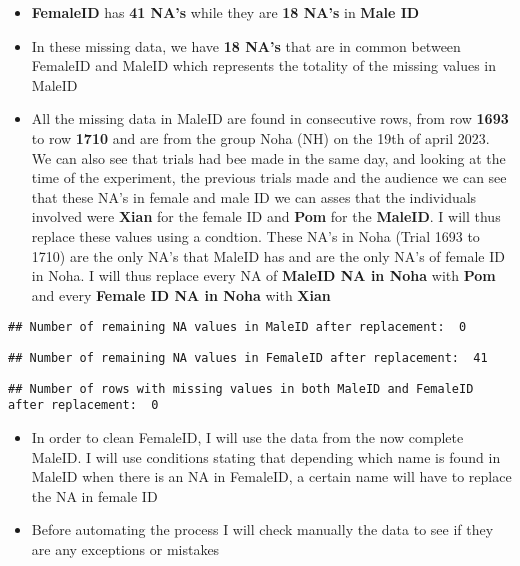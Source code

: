 \documentclass[
]{article}
\begin{document}
\begin{itemize}
\item
  \textbf{FemaleID} has \textbf{41 NA's} while they are \textbf{18 NA's}
  in \textbf{Male ID}
\item
  In these missing data, we have \textbf{18 NA's} that are in common
  between FemaleID and MaleID which represents the totality of the
  missing values in MaleID
\item
  All the missing data in MaleID are found in consecutive rows, from row
  \textbf{1693} to row \textbf{1710} and are from the group Noha (NH) on
  the 19th of april 2023. We can also see that trials had bee made in
  the same day, and looking at the time of the experiment, the previous
  trials made and the audience we can see that these NA's in female and
  male ID we can asses that the individuals involved were \textbf{Xian}
  for the female ID and \textbf{Pom} for the \textbf{MaleID}. I will
  thus replace these values using a condtion. These NA's in Noha (Trial
  1693 to 1710) are the only NA's that MaleID has and are the only NA's
  of female ID in Noha. I will thus replace every NA of \textbf{MaleID
  NA in Noha} with \textbf{Pom} and every \textbf{Female ID NA in Noha}
  with \textbf{Xian}
\end{itemize}

\begin{verbatim}
## Number of remaining NA values in MaleID after replacement:  0
\end{verbatim}

\begin{verbatim}
## Number of remaining NA values in FemaleID after replacement:  41
\end{verbatim}

\begin{verbatim}
## Number of rows with missing values in both MaleID and FemaleID after replacement:  0
\end{verbatim}

\begin{itemize}
\item
  In order to clean FemaleID, I will use the data from the now complete
  MaleID. I will use conditions stating that depending which name is
  found in MaleID when there is an NA in FemaleID, a certain name will
  have to replace the NA in female ID
\item
  Before automating the process I will check manually the data to see if
  they are any exceptions or mistakes
\end{itemize}
\end{document}
